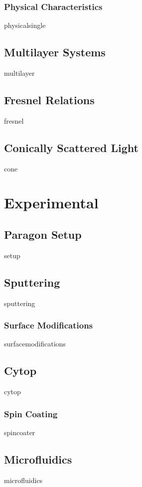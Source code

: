 \documentclass[a4paper,titlepage,onecolumn]{report}
\begin{document}
  \subsection{Physical Characteristics}
  {physicalsingle}
 \section{Multilayer Systems}
 {multilayer}
 \section{Fresnel Relations}
 {fresnel}
 \section{Conically Scattered Light}
 {cone}

\chapter{Experimental} \label{ch:experimental}
 \section{Paragon Setup}
 {setup}
 \section{Sputtering}
 {sputtering}
  \subsection{Surface Modifications}
  {surfacemodifications}
 \section{Cytop}
 {cytop}
  \subsection{Spin Coating}
  {spincoater}
 \section{Microfluidics}
 {microfluidics}
\end{document}
